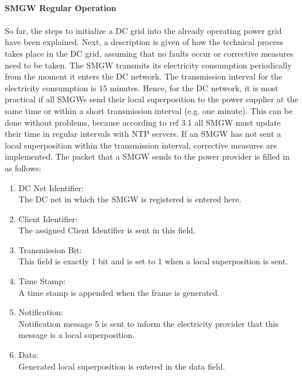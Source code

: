 \\
\textbf{SMGW Regular Operation}
\\
\\
So far, the steps to initialize a DC grid into the already operating power grid have been explained. Next, a description is given of how the technical process takes place in the DC grid, assuming that no faults occur or corrective measures need to be taken. The \gls{SMGW} transmits its electricity consumption periodically from the moment it enters the DC network. The transmission interval for the electricity consumption is 15 minutes. Hence, for the DC network, it is most practical if all \gls{SMGW}s send their local superposition to the power supplier at the same time or within a short transmission interval (e.g. one minute). This can be done without problems, because according to ref 3.1 all \gls{SMGW} must update their time in regular intervals with NTP servers. If an \gls{SMGW} has not sent a local superposition within the transmission interval, corrective measures are implemented. The packet that a \gls{SMGW} sends to the power provider is filled in as follows:
\begin{enumerate}
\item DC Net Identifier:\\
The DC net in which the \gls{SMGW} is registered is entered here.
\item Client Identifier:\\ 
The assigned Client Identifier is sent in this field.
\item Transmission Bit:\\
This field is exactly 1 bit and is set to 1 when a local superposition is sent.
\item Time Stamp:\\
A time stamp is appended when the frame is generated.
\item Notification:\\
Notification message 5 is sent to inform the electricity provider that this message is a local superposition.
\item Data:\\
Generated local superposition is entered in the data field.
\end{enumerate}
